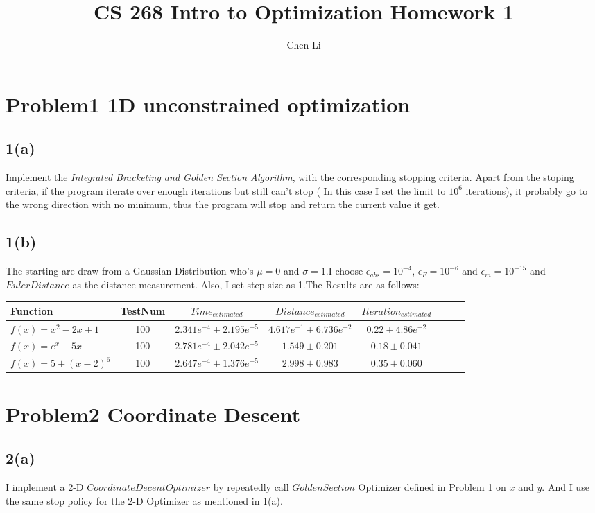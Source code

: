 \documentclass[11pt]{article}
\title{CS 268 Intro to Optimization Homework 1}
\author{Chen Li}
\begin{document}
\maketitle
\section{Problem1 1D unconstrained optimization} 
\subsection{1(a)}
Implement the \textit{Integrated Bracketing and Golden Section Algorithm}, with the corresponding stopping criteria. Apart from the stoping criteria, if the program iterate over enough iterations but still can't stop ( In this case I set the limit to $10^{6}$ iterations), it probably go to the wrong direction with no minimum, thus the program will stop and return the current value it get.
\subsection{1(b)}
The starting are draw from a Gaussian Distribution who's $\mu=0$ and $\sigma=1$.I choose $\epsilon_{abs}=10^{-4}$, $\epsilon_{F}=10^{-6}$ and $\epsilon_{m}=10^{-15}$ and $Euler Distance$ as the distance measurement. Also, I set step size as 1.The Results are as follows:
\begin{center} 
\begin{tabular}{l*{6}{c}r} Function & TestNum & $Time_{estimated}$ & $Distance_{estimated}$ & $Iteration_{estimated}$
 \\ \hline $f(x)=x^2-2x+1$ & 100 & $2.341e^{-4}\pm 2.195e^{-5}$ & $4.617e^{-1}\pm 6.736e^{-2}$ & $0.22\pm 4.86e^{-2}$
\\ $f(x)=e^x-5x$ & 100 & $2.781e^{-4}\pm 2.042e^{-5}$ & $1.549\pm 0.201$ & $0.18\pm 0.041$
\\ $f(x)=5+(x-2)^{6}$ & 100 & $2.647e^{-4}\pm 1.376e^{-5}$ & $2.998\pm 0.983$ & $0.35\pm 0.060$
\\ \end{tabular}
 \end{center}
\section{Problem2 Coordinate Descent}
\subsection{2(a)}
I implement a 2-D $Coordinate Decent Optimizer$ by repeatedly call $GoldenSection$ Optimizer defined in Problem 1 on $x$ and $y$. And I use the same stop policy for the 2-D Optimizer as mentioned in 1(a).
\end{document}
